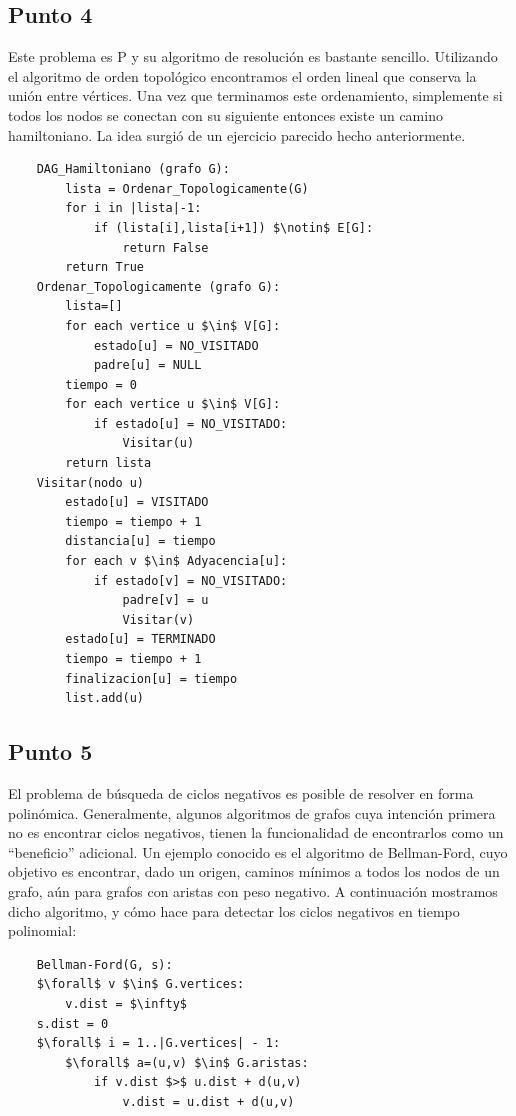 \documentclass[a4paper,10pt]{article}
\begin{document}
\subsection{Punto 4}
	Este problema es P y su algoritmo de resolución es bastante sencillo. Utilizando el algoritmo de orden topológico encontramos el orden lineal que conserva la unión entre vértices. Una vez que terminamos este ordenamiento, simplemente si todos los nodos se conectan con su siguiente entonces existe un camino hamiltoniano. La idea surgió de un ejercicio parecido hecho anteriormente.
	\begin{lstlisting}
	DAG_Hamiltoniano (grafo G):
	    lista = Ordenar_Topologicamente(G)
	    for i in |lista|-1:
	        if (lista[i],lista[i+1]) $\notin$ E[G]:
	            return False
	    return True
	Ordenar_Topologicamente (grafo G):
	    lista=[]
	    for each vertice u $\in$ V[G]:
	        estado[u] = NO_VISITADO
	        padre[u] = NULL
	    tiempo = 0
	    for each vertice u $\in$ V[G]:
	        if estado[u] = NO_VISITADO:
	            Visitar(u)
	    return lista
	Visitar(nodo u)
	    estado[u] = VISITADO
	    tiempo = tiempo + 1
	    distancia[u] = tiempo
	    for each v $\in$ Adyacencia[u]:
	        if estado[v] = NO_VISITADO:
	            padre[v] = u
	            Visitar(v)
	    estado[u] = TERMINADO
	    tiempo = tiempo + 1
	    finalizacion[u] = tiempo
	    list.add(u)
	\end{lstlisting}

\subsection{Punto 5}
	El problema de búsqueda de ciclos negativos es posible de resolver en forma polinómica. Generalmente, algunos algoritmos de grafos cuya intención primera no es encontrar ciclos negativos, tienen la funcionalidad de encontrarlos como un ``beneficio'' adicional. Un ejemplo conocido es el algoritmo de Bellman-Ford, cuyo objetivo es encontrar, dado un origen, caminos mínimos a todos los nodos de un grafo, aún para grafos con aristas con peso negativo. A continuación mostramos dicho algoritmo, y cómo hace para detectar los ciclos negativos en tiempo polinomial:
	\begin{lstlisting}
	Bellman-Ford(G, s):
	$\forall$ v $\in$ G.vertices:
	    v.dist = $\infty$
	s.dist = 0
	$\forall$ i = 1..|G.vertices| - 1:
	    $\forall$ a=(u,v) $\in$ G.aristas:
	        if v.dist $>$ u.dist + d(u,v)
	            v.dist = u.dist + d(u,v)
	\end{lstlisting}
\end{document}
